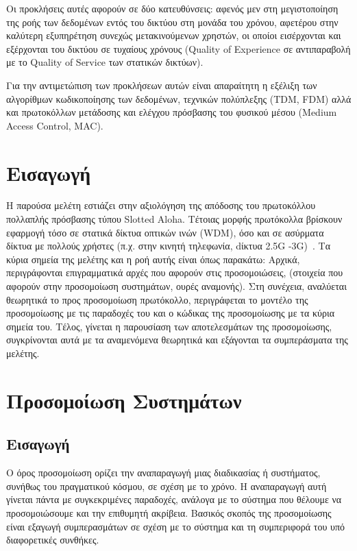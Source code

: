 \documentclass[12pt]{report}
\begin{document}
Οι προκλήσεις αυτές αφορούν σε δύο κατευθύνσεις: αφενός μεν στη μεγιστοποίηση της ροής των δεδομένων εντός του δικτύου στη μονάδα του χρόνου, αφετέρου στην καλύτερη εξυπηρέτηση συνεχώς μετακινούμενων χρηστών, οι οποίοι εισέρχονται και εξέρχονται του δικτύου σε τυχαίους χρόνους (\textlatin{Quality of Experience} σε αντιπαραβολή με το \textlatin{Quality of Service} των στατικών δικτύων).

Για την αντιμετώπιση των προκλήσεων αυτών είναι απαραίτητη η εξέλιξη των αλγορίθμων κωδικοποίησης των δεδομένων, τεχνικών πολύπλεξης (\textlatin{TDM, FDM}) αλλά και πρωτοκόλλων μετάδοσης και ελέγχου πρόσβασης του φυσικού μέσου (\textlatin{Medium Access Control, MAC}).

\section{Εισαγωγή}
Η παρούσα μελέτη εστιάζει στην αξιολόγηση της απόδοσης του πρωτοκόλλου πολλαπλής πρόσβασης τύπου \textlatin{Slotted Aloha}. Τέτοιας μορφής πρωτόκολλα βρίσκουν εφαρμογή τόσο σε στατικά δίκτυα οπτικών ινών (\textlatin{WDM}), όσο και σε ασύρματα δίκτυα με πολλούς χρήστες (π.χ. στην κινητή τηλεφωνία, dίκτυα \textlatin{2.5G -3G})~\cite{wiki:03}. Τα κύρια σημεία της μελέτης και η ροή αυτής είναι όπως παρακάτω: Αρχικά, περιγράφονται επιγραμματικά αρχές που αφορούν στις προσομοιώσεις, (στοιχεία που αφορούν στην προσομοίωση συστημάτων, ουρές αναμονής). Στη συνέχεια, αναλύεται θεωρητικά το προς προσομοίωση πρωτόκολλο, περιγράφεται το μοντέλο της προσομοίωσης με τις παραδοχές του και ο κώδικας της προσομοίωσης με τα κύρια σημεία του. Τέλος, γίνεται η παρουσίαση των αποτελεσμάτων της προσομοίωσης, συγκρίνονται αυτά με τα αναμενόμενα θεωρητικά και εξάγονται τα συμπεράσματα της μελέτης.

\section{Προσομοίωση Συστημάτων}
\subsection{Εισαγωγή}
Ο όρος προσομοίωση ορίζει την αναπαραγωγή μιας διαδικασίας ή συστήματος, συνήθως του πραγματικού κόσμου, σε σχέση με το χρόνο. Η αναπαραγωγή αυτή γίνεται πάντα με συγκεκριμένες παραδοχές, ανάλογα με το σύστημα που θέλουμε να προσομοιώσουμε και την επιθυμητή ακρίβεια. Βασικός σκοπός της προσομοίωσης είναι εξαγωγή συμπερασμάτων σε σχέση με το σύστημα και τη συμπεριφορά του υπό διαφορετικές συνθήκες.
\end{document}
